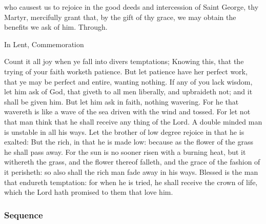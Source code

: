 \collect
{} who causest us to rejoice in the good deeds and intercession of Saint George, thy Martyr, mercifully grant that, by the gift of thy grace, we may obtain the benefits we ask of him. Through.
\begin{rubric}
    In Lent, Commemoration %
\end{rubric}

 Count it all joy when ye fall into divers temptations; Knowing this, that the trying of your faith worketh patience. But let patience have her perfect work, that ye may be perfect and entire, wanting nothing. If any of you lack wisdom, let him ask of God, that giveth to all men liberally, and upbraideth not; and it shall be given him. But let him ask in faith, nothing wavering. For he that wavereth is like a wave of the sea driven with the wind and tossed. For let not that man think that he shall receive any thing of the Lord. A double minded man is unstable in all his ways. Let the brother of low degree rejoice in that he is exalted: But the rich, in that he is made low: because as the flower of the grass he shall pass away. For the sun is no sooner risen with a burning heat, but it withereth the grass, and the flower thereof falleth, and the grace of the fashion of it perisheth: so also shall the rich man fade away in his ways. Blessed is the man that endureth temptation: for when he is tried, he shall receive the crown of life, which the Lord hath promised to them that love him.


\tractalleluianotice


\vspace{-0.2\baselineskip}

\subsubsection{Sequence}


